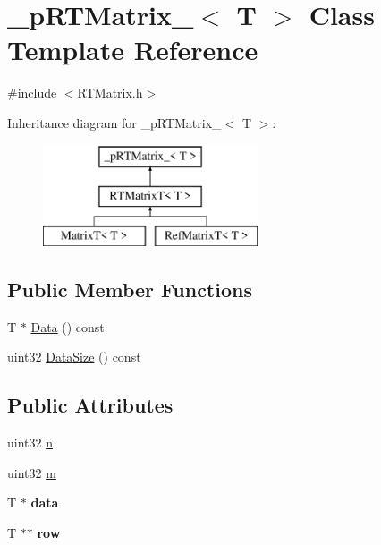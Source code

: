 \hypertarget{class__pRTMatrix__}{
\section{\_\-pRTMatrix\_\-$<$ T $>$ Class Template Reference}
\label{class__pRTMatrix__}
}


{\ttfamily \#include $<$RTMatrix.h$>$}

Inheritance diagram for \_\-pRTMatrix\_\-$<$ T $>$:\begin{figure}[H]
\begin{center}
\leavevmode
\includegraphics[height=3.000000cm]{class__pRTMatrix__}
\end{center}
\end{figure}
\subsection*{Public Member Functions}
\begin{DoxyCompactItemize}
\item 
T $\ast$ \hyperlink{class__pRTMatrix___a33cb86fe78d486c97b3f86da122e6e12}{Data} () const 
\item 
uint32 \hyperlink{class__pRTMatrix___a96fbea9ed24b21c0dec32e645972d29b}{DataSize} () const 
\end{DoxyCompactItemize}
\subsection*{Public Attributes}
\begin{DoxyCompactItemize}
\item 
uint32 \hyperlink{class__pRTMatrix___aa43a04344c78d8edef929e758e8e5263}{n}
\item 
uint32 \hyperlink{class__pRTMatrix___a365982f4a3d0d921a124ac0c21b63f6c}{m}
\item 
\hypertarget{class__pRTMatrix___ad12833157985dc5c8331fab12896f00e}{
T $\ast$ {\bfseries data}}
\label{class__pRTMatrix___ad12833157985dc5c8331fab12896f00e}

\item 
\hypertarget{class__pRTMatrix___a985951c3437d2191e9832f77fb544106}{
T $\ast$$\ast$ {\bfseries row}}
\label{class__pRTMatrix___a985951c3437d2191e9832f77fb544106}

\end{DoxyCompactItemize}


